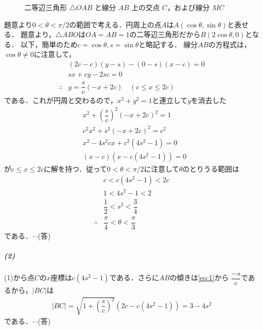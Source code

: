 \documentclass[../../main.tex]{subfiles}
\begin{document}
\begin{figure}[htb]
  \caption{二等辺三角形 $\triangle OAB$ と線分 $AB$ 上の交点 $C$，および線分 $MC$}
  \label{fig:triangle_OAB_and_point_C}
\end{figure}

題意より$0<\theta<\pi/2$の範囲で考える．円周上の点$A$は$A(\cos\theta,\sin\theta)$と表せる．
題意より，$\triangle ABO$は$OA=AB=1$の二等辺三角形だから$B(2\cos\theta,0)$となる．
以下，簡単のため$c=\cos\theta,s=\sin\theta$と略記する．
線分$AB$の方程式は，$\cos\theta\not=0$に注意して，
\begin{align}
  &(2c-c)(y-s)-(0-s)(x-c)=0     \nonumber\\
  &sx+cy-2sc=0                     \nonumber\\
  \therefore
  &y=\dfrac{s}{c}(-x+2c) \quad (c\le x\le2c) \label{eq:1}
\end{align}
である．これが円周と交わるので，$x^2+y^2=1$と連立して$y$を消去した
\begin{align}
  &x^2+\left(\dfrac{s}{c}\right)^2(-x+2c)^2=1  \nonumber\\
  &c^2x^2+s^2(-x+2c)^2=c^2 \nonumber\\
  &x^2-4s^2cx+c^2(4s^2-1)=0  \nonumber\\
  &(x-c)\left(x-c(4s^2-1)\right)=0
\end{align}
が$c\le x\le2c$に解を持つ．従って$0<\theta<\pi/2$に注意して$\theta$のとりうる範囲は
\begin{align}
  & c<c(4s^2-1)<2c \nonumber\\
  & 1<4s^2-1<2 \nonumber\\
  & \dfrac{1}{2}<s^2<\dfrac{3}{4} \label{eq:2}\\
  \therefore
  & \dfrac{\pi}{4}<\theta<\dfrac{\pi}{3}\label{eq:3}
\end{align}
である．$\cdots$(答)

\subparagraph{(2)}

(1)から点$C$の$x$座標は$c(4s^2-1)$である．さらに$AB$の傾きは\cref{eq:1}から
$\dfrac{-s}{c}$であるから，$|BC|$は
\begin{align}
  |BC|=\sqrt{1+\left(\dfrac{s}{c}\right)^2}(2c-c(4s^2-1))=3-4s^2
\end{align}
である．$\cdots$(答)
\end{document}
